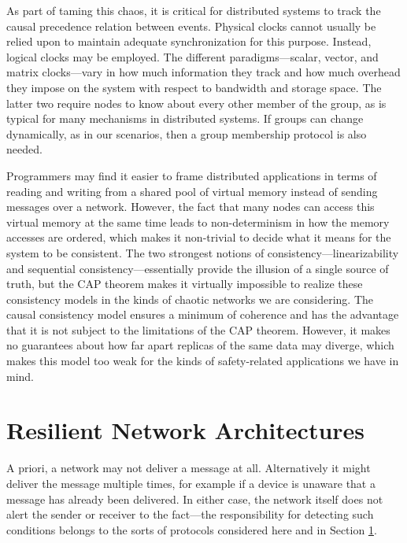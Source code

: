 \documentclass[]             %
{NASA}                       %
\theoremstyle{definition}
\begin{document}
As part of taming this chaos, it is critical for distributed systems
to track the causal precedence relation between events. Physical
clocks cannot usually be relied upon to maintain adequate
synchronization for this purpose. Instead, logical clocks may be
employed. The different paradigms---scalar, vector, and matrix
clocks---vary in how much information they track and how much overhead
they impose on the system with respect to bandwidth and storage
space. The latter two require nodes to know about every other member
of the group, as is typical for many mechanisms in distributed
systems. If groups can change dynamically, as in our scenarios, then a
group membership protocol is also needed.

Programmers may find it easier to frame distributed applications in
terms of reading and writing from a shared pool of virtual memory
instead of sending messages over a network. However, the fact that
many nodes can access this virtual memory at the same time leads to
non-determinism in how the memory accesses are ordered, which makes it
non-trivial to decide what it means for the system to be
consistent. The two strongest notions of consistency---linearizability
and sequential consistency---essentially provide the illusion of a
single source of truth, but the CAP theorem makes it virtually
impossible to realize these consistency models in the kinds of chaotic
networks we are considering. The causal consistency model ensures a
minimum of coherence and has the advantage that it is not subject to
the limitations of the CAP theorem. However, it makes no guarantees
about how far apart replicas of the same data may diverge, which makes
this model too weak for the kinds of safety-related applications we
have in mind.

\section{Resilient Network Architectures}
\label{sec:networking}



A priori, a network may not deliver a message at all. Alternatively it
might deliver the message multiple times, for example if a device is
unaware that a message has already been delivered. In either case, the
network itself does not alert the sender or receiver to the fact---the
responsibility for detecting such conditions belongs to the sorts of
protocols considered here and in Section \ref{sec:networking}.
\end{document}
